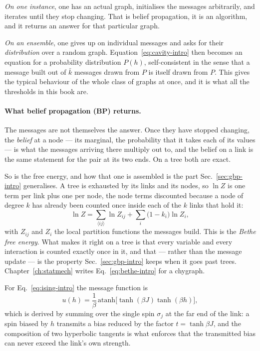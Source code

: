 \emph{On one instance}, one has an actual graph, initialises the messages
arbitrarily, and iterates until they stop changing. That is belief propagation,
it is an algorithm, and it returns an answer for that particular graph.

\emph{On an ensemble}, one gives up on individual messages and asks for their
\emph{distribution} over a random graph. Equation~\eqref{eq:cavity-intro} then
becomes an equation for a probability distribution $P(h)$, self-consistent in
the sense that a message built out of $\bar k$ messages drawn from $P$ is itself
drawn from $P$. This gives the typical behaviour of the whole class of graphs at
once, and it is what all the thresholds in this book are.

\paragraph{What belief propagation (BP) returns.} The messages are not themselves
the answer. Once they have stopped changing, the \emph{belief} at a node --- its
marginal, the probability that it takes each of its values --- is what the
messages arriving there multiply out to, and the belief on a link is the same
statement for the pair at its two ends. On a tree both are exact.

So is the free energy, and how that one is assembled is the part
Sec.~\ref{sec:gbp-intro} generalises. A tree is exhausted by its links and its
nodes, so $\ln Z$ is one term per link plus one per node, the node terms
discounted because a node of degree $k$ has already been counted once inside
each of the $k$ links that hold it:
\begin{equation}
  \ln Z=\sum_{\langle ij\rangle}\ln Z_{ij}
        +\sum_{i}\bigl(1-k_{i}\bigr)\ln Z_{i},
  \label{eq:bethe-intro}
\end{equation}
with $Z_{ij}$ and $Z_{i}$ the local partition functions the messages build. This
is the \emph{Bethe free energy}. What makes it right on a tree is that every
variable and every interaction is counted exactly once in it, and that ---
rather than the message update --- is the property Sec.~\ref{sec:gbp-intro}
keeps when it goes past trees. Chapter~\ref{ch:statmech} writes
Eq.~\eqref{eq:bethe-intro} for a chygraph.

For Eq.~\eqref{eq:ising-intro} the message function is
\[
  u(h)=\frac{1}{\beta}\,\mathrm{atanh}
       \bigl[\tanh(\beta J)\tanh(\beta h)\bigr],
\]
which is derived by summing over the single spin $\sigma_{j}$ at the far end of
the link: a spin biased by $h$ transmits a bias reduced by the factor
$t=\tanh\beta J$, and the composition of two hyperbolic tangents is what
enforces that the transmitted bias can never exceed the link's own strength.

